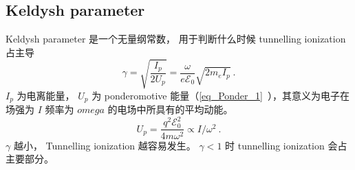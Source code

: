
\begin{issues}
\issueDraft
\end{issues}


\subsection{Keldysh parameter}
Keldysh parameter 是一个无量纲常数， 用于判断什么时候 tunnelling ionization 占主导
\begin{equation}
\gamma = \sqrt{\frac{I_p}{2U_p}} = \frac{\omega}{e\mathcal E_0} \sqrt{2m_e I_p}~.
\end{equation}
$I_p$ 为电离能量， $U_p$ 为 ponderomotive 能量（\autoref{eq_Ponder_1}~），其意义为电子在场强为 $I$ 频率为 $omega$ 的电场中所具有的平均动能。
\begin{equation}
U_p = \frac{q^2 \mathcal E_0^2}{4m\omega^2} \propto I/\omega^2~.
\end{equation}
$\gamma$ 越小， Tunnelling ionization 越容易发生。 $\gamma < 1$ 时 tunnelling ionization 会占主要部分。
